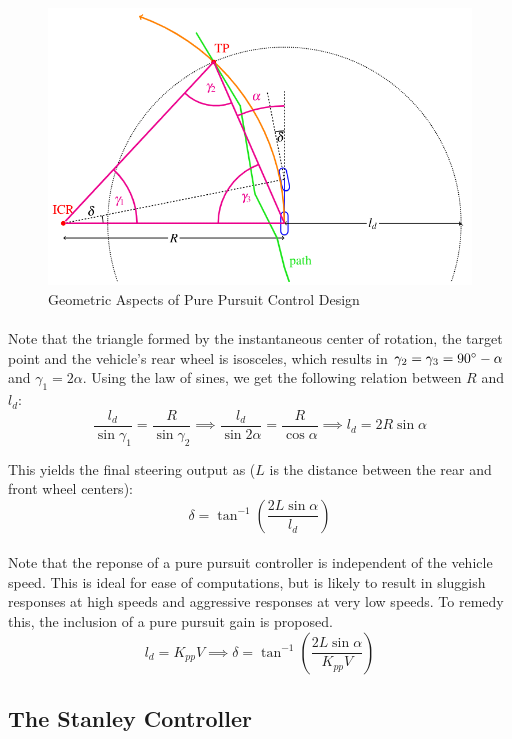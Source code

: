 \begin{figure}[H]\label{fig2.4}
\centering \includegraphics[scale = 0.7]{Images/ppc_diagram.png}
\caption{Geometric Aspects of Pure Pursuit Control Design}
\end{figure}
\paragraph{}
Note that the triangle formed by the instantaneous center of rotation, the target point and the vehicle's rear wheel is isosceles, which results in $\gamma_2 = \gamma_3 = 90\degree - \alpha$ and $\gamma_1 = 2\alpha$. Using the law of sines, we get the following relation between $R$ and $l_d$:
$$\frac{l_d}{\sin\gamma_1} = \frac{R}{\sin\gamma_2}\implies\frac{l_d}{\sin2\alpha} = \frac{R}{\cos\alpha}\implies l_d = 2R\sin\alpha$$

\noindent This yields the final steering output as ($L$ is the distance between the rear and front wheel centers): $$\delta=\tan^{-1}\left(\frac{2L\sin\alpha}{l_d}\right)$$

\paragraph{}
Note that the reponse of a pure pursuit controller is independent of the vehicle speed. This is ideal for ease of computations, but is likely to result in sluggish responses at high speeds and aggressive responses at very low speeds. To remedy this, the inclusion of a pure pursuit gain is proposed.
$$l_d = K_{pp}V\implies \delta=\tan^{-1}\left(\frac{2L\sin\alpha}{K_{pp}V}\right)$$

\subsection{The Stanley Controller}
